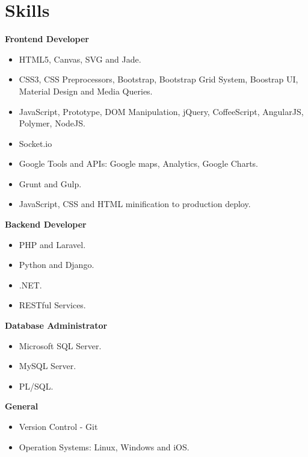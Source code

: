 \documentclass[]{friggeri-cv} %
\begin{document}
\section{Skills}

\textbf{Frontend Developer}

\begin{itemize}
	\item HTML5, Canvas, SVG and Jade.
	\item CSS3, CSS Preprocessors, Bootstrap, Bootstrap Grid System, Boostrap UI, Material Design and Media Queries.
	\item JavaScript, Prototype, DOM Manipulation, jQuery, CoffeeScript, AngularJS, Polymer, NodeJS.
	\item Socket.io
	\item Google Tools and APIs: Google maps, Analytics, Google Charts.
	\item Grunt and Gulp.
	\item JavaScript, CSS and HTML minification to production deploy.
\end{itemize}

\textbf{Backend Developer}
\begin{itemize}
	\item PHP and Laravel.
	\item Python and Django. 
	\item .NET.
	\item RESTful Services.
\end{itemize}

\textbf{Database Administrator}
\begin{itemize}
	\item Microsoft SQL Server.
	\item MySQL Server.
	\item PL/SQL.
\end{itemize}

\textbf{General}
\begin{itemize}
	\item Version Control - Git
	\item Operation Systems: Linux, Windows and iOS.
\end{itemize}

\end{document}
